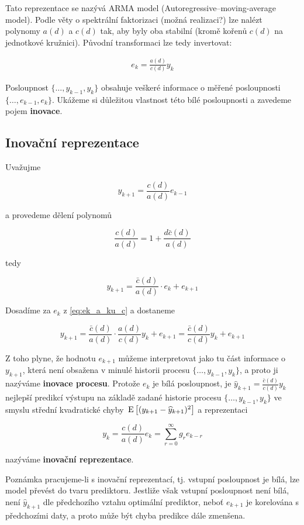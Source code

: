 Tato reprezentace se nazývá ARMA model (Autoregressive–moving-average model). Podle věty o spektrální faktorizaci (možná realizaci?) lze nalézt polynomy $a(d)$ a $c(d)$ tak, aby byly oba stabilní (kromě kořenů $c(d)$ na jednotkové kružnici). Původní transformaci lze tedy invertovat:

\begin{align} \label{eq:ek_a_ku_c}
  e_k=\frac{a(d)}{c(d)}y_k
\end{align}



Posloupnost $\{\ldots, y_{k-1}, y_k \}$ obsahuje veškeré informace o měřené posloupnosti $\{ \ldots, e_{k-1},e_k \}$. Ukážeme si důležitou vlastnost této bílé posloupnosti a zavedeme pojem \textbf{inovace}.

\subsection{Inovační reprezentace}
Uvažujme

\[ y_{k+1}=\frac{c(d)}{a(d)}e_{k-1} \]

a provedeme dělení polynomů

\[ \frac{c(d)}{a(d)} = 1+\frac{d\bar{c}(d)}{a(d)} \]

tedy

\[ y_{k+1} = \frac{\bar{c}(d)}{a(d)}\cdot e_k+e_{k+1} \]

Dosadíme za $e_k$ z \eqref{eq:ek_a_ku_c} a dostaneme

\[ y_{k+1} = \frac{\bar{c}(d)}{a(d)}\cdot\frac{a(d)}{c(d)}y_k+e_{k+1}=\frac{\bar{c}(d)}{c(d)}y_k+e_{k+1} \]

Z toho plyne, že hodnotu $e_{k+1}$ můžeme interpretovat jako tu část informace o $y_{k+1}$, která není obsažena v minulé historii procesu $\{ \ldots,y_{k-1},y_k \}$, a proto ji nazýváme \textbf{inovace procesu}. Protože $e_k$ je bílá posloupnost, je $\widehat{y}_{k+1}=\frac{\bar{c}(d)}{c(d)}y_k$ nejlepší predikcí výstupu na základě zadané historie procesu $\{ \ldots, y_{k-1},y_k \}$ ve smyslu střední kvadratické chyby $\,\mathrm{E}\left[( y_{k+1}-\widehat{y}_{k+1})^2\right]$ a reprezentaci

\[ y_k = \frac{c(d)}{a(d)}e_k = \sum_{r=0}^\infty g_r e_{k-r} \]

nazýváme \textbf{inovační reprezentace}.

\begin{note}{Poznámka}
pracujeme-li s inovační reprezentací, tj. vstupní posloupnost je bílá, lze model převést do tvaru prediktoru. Jestliže však vstupní posloupnost není bílá, není $\widehat{y}_{k+1}$ dle předchozího vztahu optimální prediktor, neboť $e_{k+1}$ je korelována s předchozími daty, a proto může být chyba predikce dále zmenšena.
\end{note}

